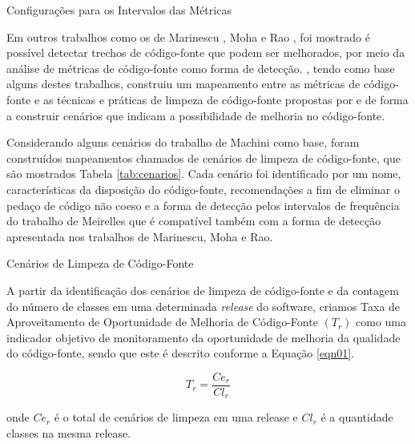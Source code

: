 	\begin{table}[!ht]
	\caption{Configurações para os Intervalos das Métricas}
	\addtolength{\belowcaptionskip}{2pt}
	\begin{center}
		
	\label{tab:good-metrics}
	\end{center}
	\end{table}
Em outros trabalhos como os de Marinescu  \cite{marinescu2005measurement}, Moha \cite{moha2010decor} e Rao \cite{rao2007detecting}, foi mostrado é possível detectar trechos de código-fonte que podem ser melhorados\cite{fowler1999refactoring}, por meio da análise de métricas de código-fonte como forma de detecção. \cite{Machini2010}, tendo como base alguns destes trabalhos, construiu um mapeamento entre as métricas de código-fonte e as técnicas e práticas de limpeza de código-fonte propostas por \cite{Martin2008} e \cite{beck2007implementation} de forma a construir cenários que indicam a possibilidade de melhoria no código-fonte.

Considerando alguns cenários do trabalho de Machini \cite{Machini2010} como base, foram construídos mapeamentos chamados de cenários de limpeza de código-fonte, que são mostrados Tabela \ref{tab:cenarios}. Cada cenário foi identificado por um nome, características da disposição do código-fonte, recomendações a fim de eliminar o pedaço de código não coeso e a forma de detecção pelos intervalos de frequência do trabalho de Meirelles \cite{Meirelles2013} que é compatível também com a forma de detecção apresentada nos trabalhos de Marinescu, Moha e Rao.
	
	\begin{table}[ht]
	\centering
	\caption{Cenários de Limpeza de Código-Fonte}
	\addtolength{\belowcaptionskip}{6pt}
		
	\label{tab:cenarios}
	\end{table}


A partir da identificação dos cenários de limpeza de código-fonte e da contagem do número de classes em uma determinada \textit{release} do software, criamos Taxa de Aproveitamento de Oportunidade de Melhoria de Código-Fonte $(T_r)$ como uma indicador objetivo de monitoramento da oportunidade de melhoria da qualidade do código-fonte, sendo que este é descrito conforme a Equação \ref{eqn01}.

\begin{equation}
\label{eqn01}
T_r =   \frac{{{Ce_r}}}{{Cl_r}}
\end{equation}

onde $ Ce_r $ é o total de cenários de limpeza em uma release e $ Cl_r $ é a quantidade classes na mesma release.

